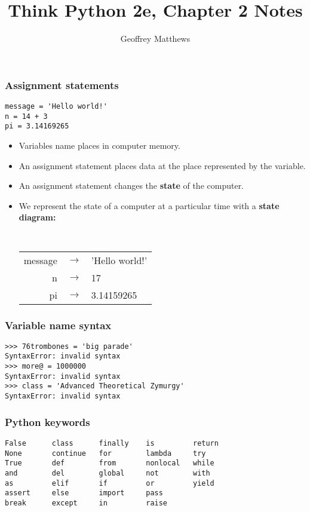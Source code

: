 \documentclass{beamer}
\title{Think Python 2e, Chapter 2 Notes}
\author{Geoffrey Matthews}
\newcommand{\bi}{\begin{itemize}}
\newcommand{\li}{\item}
\newcommand{\ei}{\end{itemize}}
\newcommand{\arrow}{{\ensuremath{\longrightarrow}}}
\newcommand{\bfr}[1]{\begin{frame}[fragile]\frametitle{{ #1 }}}
\begin{document}
\begin{frame}
\maketitle
\end{frame}

\bfr{Assignment statements}

\begin{lstlisting}
message = 'Hello world!'
n = 14 + 3
pi = 3.14169265
\end{lstlisting}

\bi
\li Variables name places in computer memory.
\li An assignment statement places data at the place 
represented by the variable.
\li An assignment statement changes the {\bf state}
of the computer.
\li We represent the state of a computer at a particular
time with a {\bf state diagram:}

\begin{minipage}{\textwidth}
\tt
\begin{tabular}{|rcl|}\hline
message & \arrow & 'Hello world!'\\
n & \arrow & 17 \\
pi &\arrow & 3.14159265\\\hline
\end{tabular}
\end{minipage}

\ei

\end{frame}
\bfr{Variable name syntax}

\begin{lstlisting}
>>> 76trombones = 'big parade'
SyntaxError: invalid syntax
>>> more@ = 1000000
SyntaxError: invalid syntax
>>> class = 'Advanced Theoretical Zymurgy'
SyntaxError: invalid syntax

\end{lstlisting}


\end{frame}

\bfr{Python keywords}
\begin{lstlisting}
False      class      finally    is         return
None       continue   for        lambda     try
True       def        from       nonlocal   while
and        del        global     not        with
as         elif       if         or         yield
assert     else       import     pass
break      except     in         raise
\end{lstlisting}


\end{frame}
\end{document}
